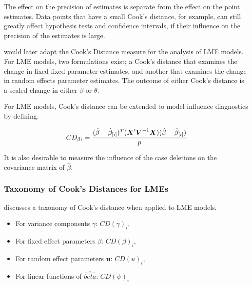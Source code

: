 \documentclass[12pt, a4paper]{report}
\theoremstyle{plain}
\theoremstyle{definition}
\theoremstyle{remark}
\begin{document}
		
		The effect on the precision of estimates is separate from the effect on the point estimates. Data points that have a small Cook's distance, for example, can still greatly affect hypothesis tests and confidence intervals, if their  influence on the precision of the estimates is large.

	\citet{Christensen} would later adapt the Cook's Distance measure for the analysis of LME models. For LME models, two formulations exist; a Cook's distance that examines the change in fixed fixed parameter estimates, and another that examines the change in random effects parameter estimates. The outcome of either Cook's distance is a scaled change in either $\beta$ or $\theta$.

	
		For LME models, Cook's distance can be extended to model influence diagnostics by defining.
		
		\[ CD_{\beta i} = {(\hat{\beta} - \hat{\beta}_{[i]})^{T}(\boldsymbol{X}^{\prime}\boldsymbol{V}^{-1}\boldsymbol{X}) (\hat{\beta} - \hat{\beta}_{[i]}) \over p}\]
		
		It is also desirable to measure the influence of the case deletions on the covariance matrix of $\hat{\beta}$.
		




	\subsubsection{Taxonomy of Cook's Distances for LMEs}
	\citet{schabenberger} discusses a taxonomy of Cook's distance when applied to LME models. \begin{itemize}
		\item For variance components $\gamma$: $CD(\gamma)_i$,
		\item For fixed effect parameters $\beta$: $CD(\beta)_i$,
		\item For random effect parameters $\boldsymbol{u}$: $CD(u)_i$,
		\item For linear functions of $\hat{beta}$: $CD(\psi)_i$
	\end{itemize}			
\end{document}
